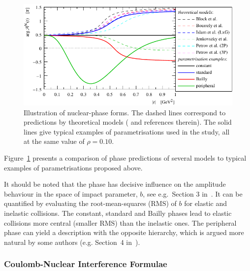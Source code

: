\begin{figure}
\begin{center}
\includegraphics{fig/hadronic_phase_illustration.pdf}
\caption{Illustration of nuclear-phase forms. The dashed lines correspond to predictions by theoretical models (\cite{elegent} and references therein). The solid lines give typical examples of parametrisations used in the study, all at the same value of $\rho = 0.10$.
}
\label{fig:phase illustration}
\end{center}
\end{figure}

Figure~\ref{fig:phase illustration} presents a comparison of phase predictions of several models to typical examples of parametrisations proposed above.

It should be noted that the phase has decisive influence on the amplitude behaviour in the space of impact parameter, $b$, see e.g.~Section 3 in~\cite{klk02}. It can be quantified by evaluating the root-mean-squares (RMS) of $b$ for elastic and inelastic collisions. The constant, standard and Bailly phases lead to elastic collisions more central (smaller RMS) than the inelastic ones. The peripheral phase can yield a description with the opposite hierarchy, which is argued more natural by some authors (e.g. Section~4 in~\cite{kl96}).

\subsubsection{Coulomb-Nuclear Interference Formulae}
\label{sec:cni interference}

